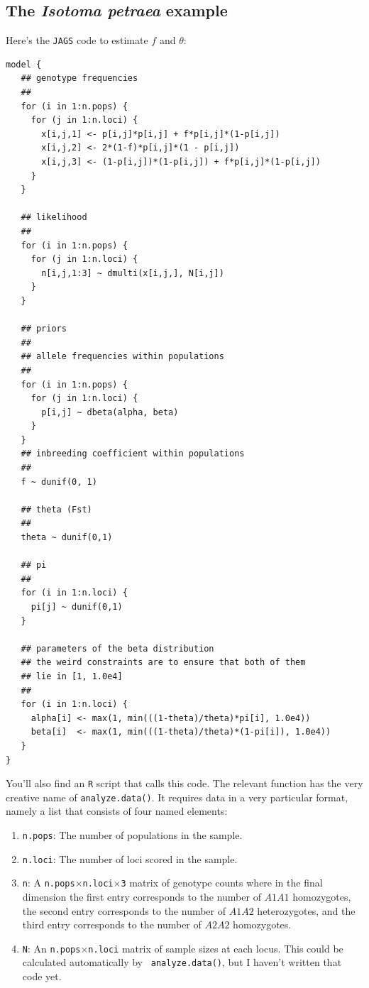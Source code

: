 \documentclass[12pt]{article}
\begin{document}
\subsection*{The {\it Isotoma petraea} example}

Here's the {\tt JAGS} code to estimate $f$ and $\theta$:
\begin{verbatim}
model {
   ## genotype frequencies
   ##
   for (i in 1:n.pops) {
     for (j in 1:n.loci) {
       x[i,j,1] <- p[i,j]*p[i,j] + f*p[i,j]*(1-p[i,j])
       x[i,j,2] <- 2*(1-f)*p[i,j]*(1 - p[i,j])
       x[i,j,3] <- (1-p[i,j])*(1-p[i,j]) + f*p[i,j]*(1-p[i,j])
     }
   }

   ## likelihood
   ##
   for (i in 1:n.pops) {
     for (j in 1:n.loci) {
       n[i,j,1:3] ~ dmulti(x[i,j,], N[i,j])
     }
   }

   ## priors
   ##
   ## allele frequencies within populations
   ##
   for (i in 1:n.pops) {
     for (j in 1:n.loci) {
       p[i,j] ~ dbeta(alpha, beta)
     }
   }
   ## inbreeding coefficient within populations
   ##
   f ~ dunif(0, 1)

   ## theta (Fst)
   ##
   theta ~ dunif(0,1)

   ## pi
   ##
   for (i in 1:n.loci) {
     pi[j] ~ dunif(0,1)
   }

   ## parameters of the beta distribution
   ## the weird constraints are to ensure that both of them
   ## lie in [1, 1.0e4]
   ##
   for (i in 1:n.loci) {
     alpha[i] <- max(1, min(((1-theta)/theta)*pi[i], 1.0e4))
     beta[i]  <- max(1, min(((1-theta)/theta)*(1-pi[i]), 1.0e4))
   }
}
\end{verbatim}

You'll also find an {\tt R} script that calls this code. The relevant
function has the very creative name of {\tt analyze.data()}. It
requires data in a very particular format, namely a list that consists
of four named elements:

\begin{enumerate}

\item {\tt n.pops}: The number of populations in the sample.

\item {\tt n.loci}: The number of loci scored in the sample.

\item {\tt n}: A {\tt n.pops}$\times${\tt n.loci}$\times${\tt 3}
  matrix of genotype counts where in the final dimension the first
  entry corresponds to the number of $A1A1$ homozygotes, the second
  entry corresponds to the number of $A1A2$ heterozygotes, and the
  third entry corresponds to the number of $A2A2$ homozygotes.

\item {\tt N}: An {\tt n.pops}$\times${\tt n.loci} matrix of sample
  sizes at each locus. This could be calculated automatically by {\tt
    analyze.data()}, but I haven't written that code yet.

\end{enumerate}
\end{document}
